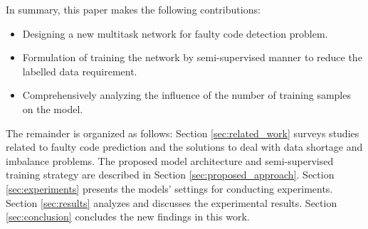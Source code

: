 In  summary, this paper makes the following contributions:
\begin{itemize}
    \item Designing a new multitask network for faulty code detection problem.
    \item Formulation of training the network by semi-supervised manner to reduce the labelled data requirement.
    \item Comprehensively analyzing the influence of the number of training samples on the model.
\end{itemize}{}{}

The remainder is organized as follows: Section \ref{sec:related_work} surveys studies related to faulty code prediction and the solutions to deal with data shortage and imbalance problems. The proposed model architecture and semi-supervised training strategy are described in Section \ref{sec:proposed_approach}. Section \ref{sec:experiments} presents the models' settings for conducting experiments. Section \ref{sec:results} analyzes and discusses  the  experimental  results. Section \ref{sec:conclusion} concludes the new findings in this work.